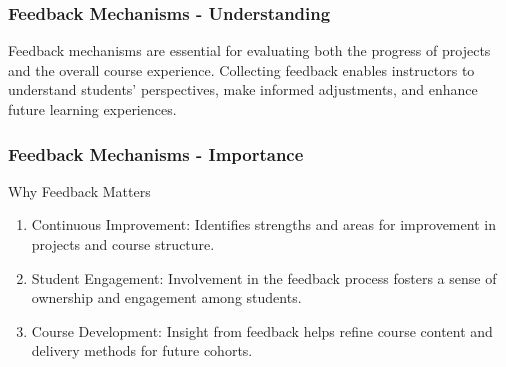 \documentclass[aspectratio=169]{beamer}
\begin{document}
\begin{frame}[fragile]
    \frametitle{Feedback Mechanisms - Understanding}
    Feedback mechanisms are essential for evaluating both the progress of projects and the overall course experience. 
    Collecting feedback enables instructors to understand students' perspectives, make informed adjustments, and enhance future learning experiences.
\end{frame}

\begin{frame}[fragile]
    \frametitle{Feedback Mechanisms - Importance}
    \begin{block}{Why Feedback Matters}
        \begin{enumerate}
            \item Continuous Improvement: Identifies strengths and areas for improvement in projects and course structure.
            \item Student Engagement: Involvement in the feedback process fosters a sense of ownership and engagement among students.
            \item Course Development: Insight from feedback helps refine course content and delivery methods for future cohorts.
        \end{enumerate}
    \end{block}
\end{frame}
\end{document}
